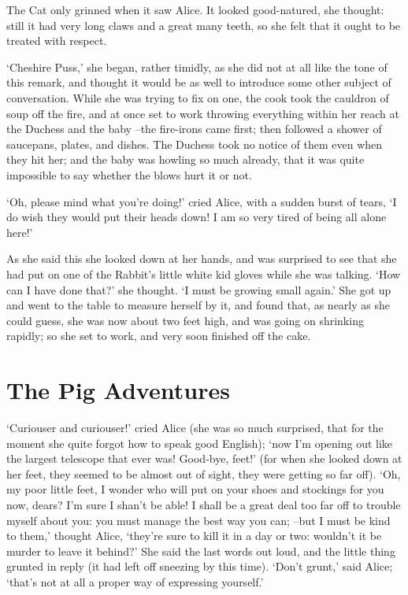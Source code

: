 \documentclass[statementpaper,twoside,openany]{memoir}
\begin{document}
The Cat only grinned when it saw Alice. It looked good-natured, she thought: still it had very long claws and a great many teeth, so she felt that it ought to be treated with respect.

`Cheshire Puss,' she began, rather timidly, as she did not at all like the tone of this remark, and thought it would be as well to introduce some other subject of conversation. While she was trying to fix on one, the cook took the cauldron of soup off the fire, and at once set to work throwing everything within her reach at the Duchess and the baby --the fire-irons came first; then followed a shower of saucepans, plates, and dishes. The Duchess took no notice of them even when they hit her; and the baby was howling so much already, that it was quite impossible to say whether the blows hurt it or not.

`Oh, please mind what you're doing!' cried Alice, with a sudden burst of tears, `I do wish they would put their heads down! I am so very tired of being all alone here!'

As she said this she looked down at her hands, and was surprised to see that she had put on one of the Rabbit's little white kid gloves while she was talking. `How can I have done that?' she thought. `I must be growing small again.' She got up and went to the table to measure herself by it, and found that, as nearly as she could guess, she was now about two feet high, and was going on shrinking rapidly; so she set to work, and very soon finished off the cake.

\chapter{The Pig Adventures}

`Curiouser and curiouser!' cried Alice (she was so much surprised, that for the moment she quite forgot how to speak good English); `now I'm opening out like the largest telescope that ever was! Good-bye, feet!' (for when she looked down at her feet, they seemed to be almost out of sight, they were getting so far off). `Oh, my poor little feet, I wonder who will put on your shoes and stockings for you now, dears? I'm sure I shan't be able! I shall be a great deal too far off to trouble myself about you: you must manage the best way you can; --but I must be kind to them,' thought Alice, `they're sure to kill it in a day or two: wouldn't it be murder to leave it behind?' She said the last words out loud, and the little thing grunted in reply (it had left off sneezing by this time). `Don't grunt,' said Alice; `that's not at all a proper way of expressing yourself.'
\end{document}
